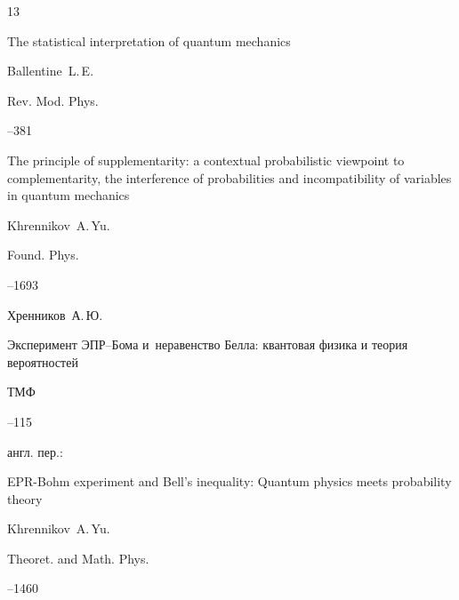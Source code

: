 \begin{thebibliography}{13}




\paper The statistical interpretation of quantum mechanics 

\by Ballentine~L.\,E. 

\jour Rev. Mod. Phys. 




--381








\paper The principle of supplementarity: a contextual probabilistic viewpoint to complementarity, the interference of probabilities and incompatibility of variables in quantum mechanics

\by Khrennikov~A.\,Yu. 

\jour Found. Phys. 




--1693






\by Хренников~А.\,Ю.

\paper Эксперимент ЭПР--Бома и~неравенство Белла: квантовая физика и теория вероятностей

\jour ТМФ




--115

\transl англ. пер.:~

\paper EPR-Bohm experiment and Bell's inequality: Quantum physics meets probability theory 

\by Khrennikov~A.\,Yu.

\jour Theoret. and Math. Phys.




--1460








\end{thebibliography}
